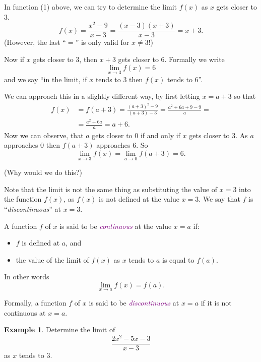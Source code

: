 \documentclass[
  english,
  11pt,
  oneside]{book}
\providecommand{\tightlist}{%
  \setlength{\itemsep}{0pt}\setlength{\parskip}{0pt}}
\newcommand{\slide}{}
\theoremstyle{definition}
\theoremstyle{definition}
\newtheorem{example}{Example}[chapter]
\theoremstyle{definition}
\theoremstyle{definition}
\theoremstyle{remark}
\begin{document}
\slide

In function (1) above, we can try to determine the limit \(f(x)\) as \(x\) gets closer to \(3\).
\[
f(x) = \frac{x^2-9}{x-3} = \frac{(x-3)(x+3)}{x-3} = x+3.
\]
(However, the last ``\(=\)'' is only valid for \(x\not=3\)!)

Now if \(x\) gets closer to \(3\), then \(x+3\) gets closer to \(6\). Formally we write
\[
\lim\limits_{x\to3} f(x) = 6
\]
and we say ``in the limit, if \(x\) tends to \(3\) then \(f(x)\) tends to 6''.

\slide

We can approach this in a slightly different way, by first letting \(x = a+3\) so that
\begin{align*}
f(x) &= f(a+3) = \frac{(a+3)^2-9}{(a+3)-3} = \frac{a^2+6a + 9 - 9}{a} =\\
&= \frac{a^2+6a}{a} = a+6.
\end{align*}
Now we can observe, that \(a\) gets closer to \(0\) if and only if \(x\) gets closer to \(3\). As \(a\) approaches \(0\) then \(f(a+3)\) approaches \(6\). So
\[
\lim\limits_{x\to3}f(x) = \lim\limits_{a\to0}f(a+3) = 6.
\]

(Why would we do this?)

\slide

Note that the limit is not the same thing as substituting the value of \(x=3\) into the function \(f(x)\), as \(f(x)\) is not defined at the value \(x=3\). We say that \(f\) is ``\emph{discontinuous}'' at \(x=3\).

A function \(f\) of \(x\) is said to be \textcolor{purple}{\em continuous} at the value \(x=a\) if:

\begin{itemize}
\tightlist
\item
  \(f\) is defined at \(a\), and
\item
  the value of the limit of \(f(x)\) as \(x\) tends to \(a\) is equal to \(f(a)\).
\end{itemize}

In other words
\[
\lim\limits_{x\to a}f(x) = f(a).
\]

Formally, a function \(f\) of \(x\) is said to be \textcolor{purple}{\em discontinuous} at \(x=a\) if it is not continuous at \(x=a\).
\slide

\begin{example}
Determine the limit of
\[
\frac{2x^2-5x-3}{x-3}
\]
as \(x\) tends to \(3\).
\end{example}
\end{document}
